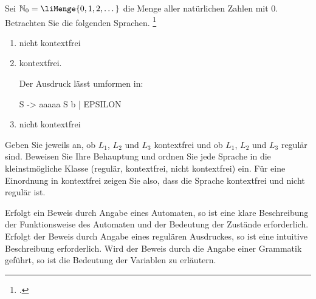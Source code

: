 \documentclass{bschlangaul-aufgabe}
\begin{document}

\let\m=\liMenge
\def\l#1{$L_#1$}

Sei $\mathbb{N}_0 = \m{0,1,2,\dots}$ die Menge aller natürlichen Zahlen
mit $0$. Betrachten Sie die folgenden Sprachen.
\footcite{examen:46115:2021:03}
\begin{enumerate}


\item {}

\begin{liAntwort}
nicht kontextfrei
\end{liAntwort}


\item {}

\begin{liAntwort}
kontextfrei.

Der Ausdruck lässt umformen in: 

\begin{liProduktionsRegeln}
S -> aaaaa S b | EPSILON
\end{liProduktionsRegeln}
\end{liAntwort}


\item {}

\begin{liAntwort}
nicht kontextfrei
\end{liAntwort}

\end{enumerate}

\noindent
Geben Sie jeweils an, ob \l1, \l2 und \l3 kontextfrei und ob \l1, \l2
und \l3 regulär sind. Beweisen Sie Ihre Behauptung und ordnen Sie jede
Sprache in die kleinstmögliche Klasse (regulär, kontextfrei, nicht
kontextfrei) ein. Für eine Einordnung in kontextfrei zeigen Sie also,
dass die Sprache kontextfrei und nicht regulär ist.

Erfolgt ein Beweis durch Angabe eines Automaten, so ist eine klare
Beschreibung der Funktionsweise des Automaten und der Bedeutung der
Zustände erforderlich. Erfolgt der Beweis durch Angabe eines regulären
Ausdruckes, so ist eine intuitive Beschreibung erforderlich. Wird der
Beweis durch die Angabe einer Grammatik geführt, so ist die Bedeutung
der Variablen zu erläutern.
\end{document}
